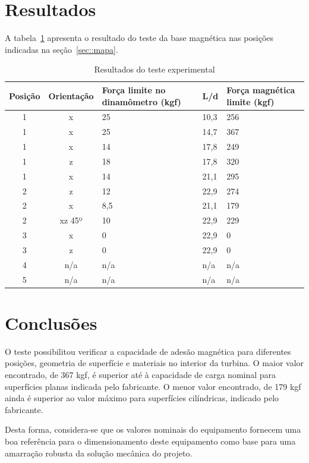 \documentclass[12pt,a4paper]{article}
\begin{document}
\section{Resultados} \label{sec::resultados}
A tabela~\ref{table:1} apresenta o resultado do teste da base magnética nas
posições indicadas na seção~\ref{sec::mapa}.

\begin{table}[h!]
\centering
\begin{tabular}{||c c m{7em} m{4em} m{6em}||} 
 \hline
 Posição & Orientação & Força limite no dinamômetro (kgf) & L/d & Força
 magnética limite (kgf) \\  [0.5ex] 
 \hline\hline
 1 & x & 25 & 10,3 & 256 \\ 
 1 & x & 25 & 14,7 & 367 \\
 1 & x & 14 & 17,8 & 249 \\
 1 & z & 18 & 17,8 & 320 \\
 1 & x & 14 & 21,1 & 295 \\
 2 & z & 12 & 22,9 & 274 \\
 2 & x & 8,5 & 21,1 & 179 \\
 2 & xz 45º & 10 & 22,9 & 229 \\
 3 & x & 0 & 22,9 & 0 \\
 3 & z & 0 & 22,9 & 0 \\
 4 & n/a & n/a & n/a & n/a \\
 5 & n/a & n/a & n/a & n/a \\ [1ex]
 \hline
\end{tabular}
\caption{Resultados do teste experimental}
\label{table:1}
\end{table}


\section{Conclusões}
O teste possibilitou verificar a capacidade de adesão magnética para diferentes
posições, geometria de superfície e materiais no interior da turbina. O maior
valor encontrado, de 367 kgf, é superior até à capacidade de carga nominal para
superfícies planas indicada pelo fabricante. O menor valor encontrado, de 179
kgf ainda é superior ao valor máximo para superfícies cilíndricas, indicado pelo
fabricante.

Desta forma, considera-se que os valores nominais do equipamento fornecem uma
boa referência para o dimensionamento deste equipamento como base para uma
amarração robusta da solução mecânica do projeto.
\end{document}
